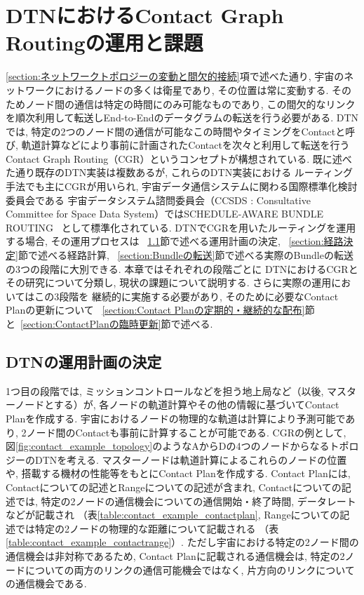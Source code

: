 \chapter{DTNにおけるContact Graph Routingの運用と課題}
\label{chap:cgr_in_dtn}

\ref{section:ネットワークトポロジーの変動と間欠的接続}項で述べた通り, 
宇宙のネットワークにおけるノードの多くは衛星であり, その位置は常に変動する.  
そのためノード間の通信は特定の時間にのみ可能なものであり, 
この間欠的なリンクを順次利用して転送しEnd-to-Endのデータグラムの転送を行う必要がある.  
DTNでは, 特定の2つのノード間の通信が可能なこの時間やタイミングをContactと呼び, 
軌道計算などにより事前に計画されたContactを次々と利用して転送を行う
Contact Graph Routing（CGR）\cite{Fraire2021}というコンセプトが構想されている.  
既に述べた通り既存のDTN実装は複数あるが, これらのDTN実装における
ルーティング手法でも主にCGRが用いられ, 宇宙データ通信システムに関わる国際標準化検討委員会である
宇宙データシステム諮問委員会（CCSDS : Consultative Committee 
for Space Data System）ではSCHEDULE-AWARE BUNDLE ROUTING
~\cite{schedule_aware_bundle_routing}として標準化されている.  
DTNでCGRを用いたルーティングを運用する場合, その運用プロセスは
~\ref{section:運用計画の決定}節で述べる運用計画の決定, 
~\ref{section:経路決定}節で述べる経路計算, 
~\ref{section:Bundleの転送}節で述べる実際のBundleの転送
の3つの段階に大別できる.  本章ではそれぞれの段階ごとに
DTNにおけるCGRとその研究について分類し, 現状の課題について説明する.  
さらに実際の運用においてはこの3段階を
継続的に実施する必要があり, そのために必要なContact Planの更新について
~\ref{section:Contact Planの定期的・継続的な配布}節と~\ref{section:ContactPlanの臨時更新}節で述べる.  

\section{DTNの運用計画の決定}
\label{section:運用計画の決定}
1つ目の段階では, ミッションコントロールなどを担う地上局など（以後, マスターノードとする）が, 
各ノードの軌道計算やその他の情報に基づいてContact Planを作成する.  
宇宙におけるノードの物理的な軌道は計算により予測可能であり, 
2ノード間のContactも事前に計算することが可能である.   
CGRの例として, 図\ref{fig:contact_example_topology}のようなAからDの4つのノードからなるトポロジーのDTNを考える.  
マスターノードは軌道計算によるこれらのノードの位置や, 搭載する機材の性能等をもとにContact Planを作成する.  
Contact Planには, Contactについての記述とRangeについての記述が含まれ, 
Contactについての記述では, 特定の2ノードの通信機会についての通信開始・終了時間, データレートなどが記載され
（表\ref{table:contact_example_contactplan}, Rangeについての記述では特定の2ノードの物理的な距離について記載される
（表\ref{table:contact_example_contactrange}）.  
ただし宇宙における特定の2ノード間の通信機会は非対称であるため, 
Contact Planに記載される通信機会は, 特定の2ノードについての両方のリンクの通信可能機会ではなく, 
片方向のリンクについての通信機会である. 

